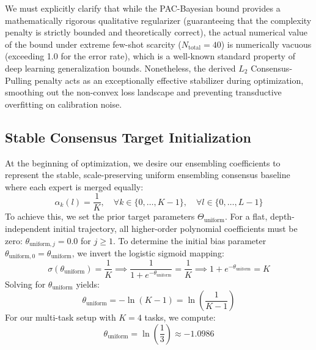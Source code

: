 \begin{remark}
We must explicitly clarify that while the PAC-Bayesian bound provides a mathematically rigorous qualitative regularizer (guaranteeing that the complexity penalty is strictly bounded and theoretically correct), the actual numerical value of the bound under extreme few-shot scarcity ($N_{\text{total}} = 40$) is numerically vacuous (exceeding 1.0 for the error rate), which is a well-known standard property of deep learning generalization bounds. Nonetheless, the derived $L_2$ Consensus-Pulling penalty acts as an exceptionally effective stabilizer during optimization, smoothing out the non-convex loss landscape and preventing transductive overfitting on calibration noise.
\end{remark}

\subsection{Stable Consensus Target Initialization}
\label{subsec:initialization_consensus}
At the beginning of optimization, we desire our ensembling coefficients to represent the stable, scale-preserving uniform ensembling consensus baseline where each expert is merged equally:
\begin{equation}
\alpha_k(l) = \frac{1}{K}, \quad \forall k \in \{0, \dots, K-1\}, \quad \forall l \in \{0, \dots, L-1\}
\end{equation}
To achieve this, we set the prior target parameters $\Theta_{\text{uniform}}$. For a flat, depth-independent initial trajectory, all higher-order polynomial coefficients must be zero: $\theta_{\text{uniform}, j} = 0.0$ for $j \ge 1$. To determine the initial bias parameter $\theta_{\text{uniform}, 0} = \theta_{\text{uniform}}$, we invert the logistic sigmoid mapping:
\begin{equation}
\sigma(\theta_{\text{uniform}}) = \frac{1}{K} \implies \frac{1}{1 + e^{-\theta_{\text{uniform}}}} = \frac{1}{K} \implies 1 + e^{-\theta_{\text{uniform}}} = K
\end{equation}
Solving for $\theta_{\text{uniform}}$ yields:
\begin{equation}
\theta_{\text{uniform}} = -\ln(K - 1) = \ln\left(\frac{1}{K-1}\right)
\end{equation}
For our multi-task setup with $K = 4$ tasks, we compute:
\begin{equation}
\theta_{\text{uniform}} = \ln\left(\frac{1}{3}\right) \approx -1.0986
\end{equation}

